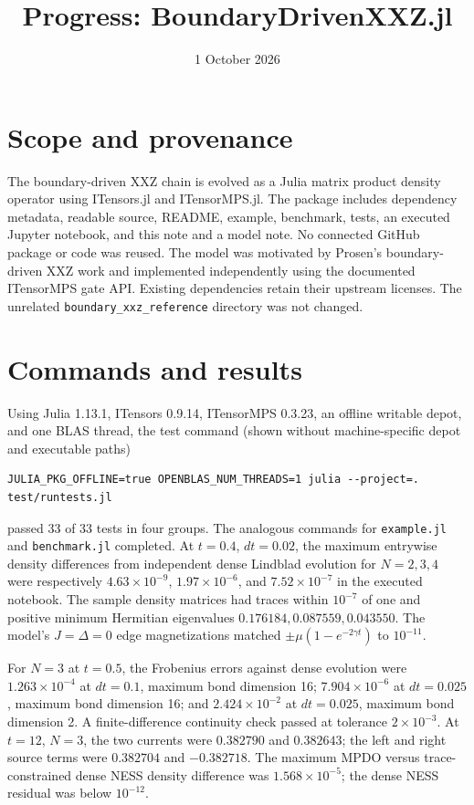 \documentclass[11pt]{article}
\title{Progress: BoundaryDrivenXXZ.jl}
\date{1 October 2026}
\begin{document}
\maketitle
\section*{Scope and provenance}
The boundary-driven XXZ chain is evolved as a Julia matrix product density
operator using ITensors.jl and ITensorMPS.jl.
The package includes dependency metadata, readable source, README, example,
benchmark, tests, an executed Jupyter notebook, and this note and a model
note. No connected GitHub package or code was reused. The model was
motivated by Prosen's boundary-driven XXZ work and implemented independently
using the documented ITensorMPS gate API. Existing dependencies retain
their upstream licenses. The unrelated \texttt{boundary\_xxz\_reference}
directory was not changed.
\section*{Commands and results}
Using Julia 1.13.1, ITensors 0.9.14, ITensorMPS 0.3.23, an offline
writable depot, and one BLAS thread, the test command (shown without
machine-specific depot and executable paths)
\begin{verbatim}
JULIA_PKG_OFFLINE=true OPENBLAS_NUM_THREADS=1 julia --project=. test/runtests.jl
\end{verbatim}
passed 33 of 33 tests in four groups. The analogous commands for
\texttt{example.jl} and \texttt{benchmark.jl} completed. At $t=0.4$,
$dt=0.02$, the maximum entrywise density differences from independent
dense Lindblad evolution for $N=2,3,4$ were respectively
$4.63\times10^{-9}$, $1.97\times10^{-6}$, and $7.52\times10^{-7}$
in the executed notebook. The sample density matrices had traces within
$10^{-7}$ of one and positive minimum Hermitian eigenvalues
$0.176184,0.087559,0.043550$. The model's $J=\Delta=0$ edge
magnetizations matched $\pm\mu(1-e^{-2\gamma t})$ to $10^{-11}$.

For $N=3$ at $t=0.5$, the Frobenius errors against dense evolution were
$1.263\times10^{-4}$ at $dt=0.1$, maximum bond dimension 16;
$7.904\times10^{-6}$ at $dt=0.025$, maximum bond dimension 16; and
$2.424\times10^{-2}$ at $dt=0.025$, maximum bond dimension 2.
A finite-difference continuity check passed at tolerance $2\times10^{-3}$.
At $t=12$, $N=3$, the two currents were $0.382790$ and $0.382643$;
the left and right source terms were $0.382704$ and $-0.382718$.
The maximum MPDO versus trace-constrained dense NESS density difference
was $1.568\times10^{-5}$; the dense NESS residual was below $10^{-12}$.
\end{document}
